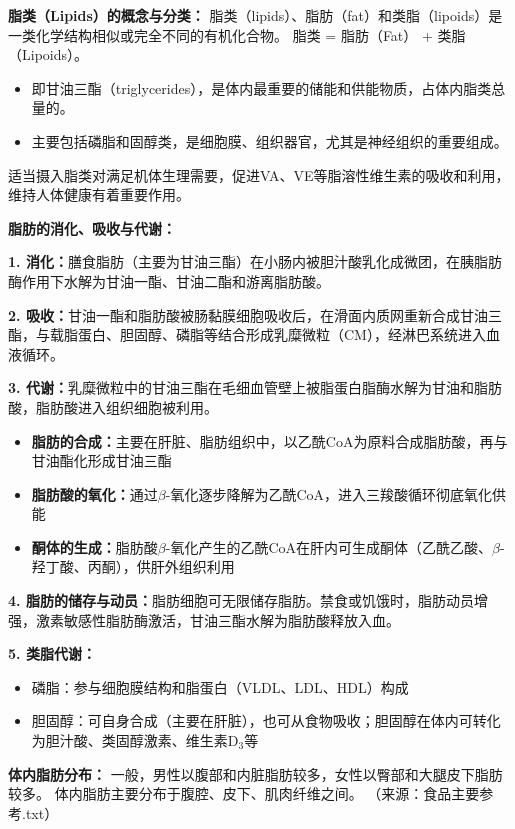 \begin{tipbox}
\textbf{脂类（Lipids）的概念与分类：}
脂类（lipids）、脂肪（fat）和类脂（lipoids）是一类化学结构相似或完全不同的有机化合物。
脂类 = 脂肪（Fat） + 类脂（Lipoids）。
\begin{itemize}[leftmargin=*]
    \item {}即甘油三酯（triglycerides），是体内最重要的储能和供能物质，占体内脂类总量的。
    \item {}主要包括磷脂和固醇类，是细胞膜、组织器官，尤其是神经组织的重要组成。
\end{itemize}
适当摄入脂类对满足机体生理需要，促进VA、VE等脂溶性维生素的吸收和利用，维持人体健康有着重要作用。

\textbf{脂肪的消化、吸收与代谢：}

\textbf{1. 消化：}膳食脂肪（主要为甘油三酯）在小肠内被胆汁酸乳化成微团，在胰脂肪酶作用下水解为甘油一酯、甘油二酯和游离脂肪酸。

\textbf{2. 吸收：}甘油一酯和脂肪酸被肠黏膜细胞吸收后，在滑面内质网重新合成甘油三酯，与载脂蛋白、胆固醇、磷脂等结合形成乳糜微粒（CM），经淋巴系统进入血液循环。

\textbf{3. 代谢：}乳糜微粒中的甘油三酯在毛细血管壁上被脂蛋白脂酶水解为甘油和脂肪酸，脂肪酸进入组织细胞被利用。
\begin{itemize}[leftmargin=*]
    \item \textbf{脂肪的合成：}主要在肝脏、脂肪组织中，以乙酰CoA为原料合成脂肪酸，再与甘油酯化形成甘油三酯
    \item \textbf{脂肪酸的氧化：}通过$\beta$-氧化逐步降解为乙酰CoA，进入三羧酸循环彻底氧化供能
    \item \textbf{酮体的生成：}脂肪酸$\beta$-氧化产生的乙酰CoA在肝内可生成酮体（乙酰乙酸、$\beta$-羟丁酸、丙酮），供肝外组织利用
\end{itemize}

\textbf{4. 脂肪的储存与动员：}脂肪细胞可无限储存脂肪。禁食或饥饿时，脂肪动员增强，激素敏感性脂肪酶激活，甘油三酯水解为脂肪酸释放入血。

\textbf{5. 类脂代谢：}
\begin{itemize}[leftmargin=*]
    \item 磷脂：参与细胞膜结构和脂蛋白（VLDL、LDL、HDL）构成
    \item 胆固醇：可自身合成（主要在肝脏），也可从食物吸收；胆固醇在体内可转化为胆汁酸、类固醇激素、维生素D$_3$等
\end{itemize}

\textbf{体内脂肪分布：}
一般，男性以腹部和内脏脂肪较多，女性以臀部和大腿皮下脂肪较多。
体内脂肪主要分布于腹腔、皮下、肌肉纤维之间。
（来源：食品主要参考.txt）
\end{tipbox}

